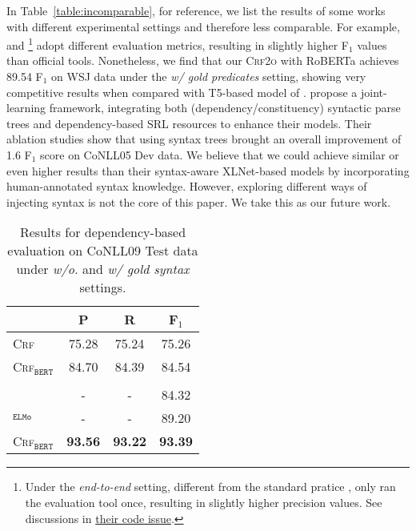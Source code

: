 \documentclass[11pt]{article}
\begin{document}
In Table~\ref{table:incomparable}, for reference, we list the results of some works with different experimental settings and therefore less comparable.
For example, \citet{paolini-etal-2021-structured} and \citet{strubell-etal-2018-lisa}\footnote{
    Under the \emph{end-to-end} setting, different from the standard pratice \cite{he-etal-2018-jointly}, \citet{strubell-etal-2018-lisa} only ran the evaluation tool once, resulting in slightly higher precision values.
    See discussions in \href{https://github.com/strubell/LISA/issues/9}{their code issue}.
}
adopt different evaluation metrics, resulting in slightly higher F$_1$ values than official tools.
Nonetheless, we find that our \textsc{Crf2o} with RoBERTa achieves 89.54 F$_1$ on WSJ data under the \emph{w/ gold predicates} setting, showing very competitive results when compared with T5-based model of \citet{paolini-etal-2021-structured}.
\citet{zhou-etal-2020-parsing} propose a joint-learning framework, integrating both (dependency/constituency) syntactic parse trees and dependency-based SRL resources to enhance their models.
Their ablation studies show that using syntax trees brought an overall improvement of 1.6 F$_1$ score on CoNLL05 Dev data.
We believe that we could achieve similar or even higher results than their syntax-aware XLNet-based models by incorporating human-annotated syntax knowledge.
However, exploring different ways of injecting syntax is not the core of this paper.
We take this as our future work.

\begin{table}[tb!]
    \renewcommand{\arraystretch}{1.1}
    \centering
    \small
    \begin{tabular}{l ccc}
        \toprule
        \rowcolor[gray]{0.95}                           & P              & R              & F$_1$          \\
        \midrule
        \textsc{Crf}                                    & 75.28          & 75.24          & 75.26          \\
        \textsc{Crf}$_\texttt{BERT}$                    & 84.70          & 84.39          & 84.54          \\
        \rowcolor[gray]{0.95} \multicolumn{4}{c}{\emph{w/ gold syntax}}                                    \\
        \citet{johansson-nugues-2008-effect}            & -              & -              & 84.32          \\
        \citet{li-etal-2019-dependency}$_\texttt{ELMo}$ & -              & -              & 89.20          \\
        \textsc{Crf}$_\texttt{BERT}$                    & \textbf{93.56} & \textbf{93.22} & \textbf{93.39} \\
        \bottomrule
    \end{tabular}
    \caption{Results for dependency-based evaluation on CoNLL09 Test data under \emph{w/o.} and \emph{w/ gold syntax} settings.}
    \label{table:conll09}
\end{table}
\end{document}
